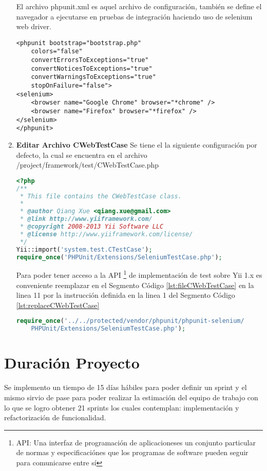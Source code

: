 \begin{enumerate}
El archivo phpunit.xml es aquel archivo de configuraci\'{o}n, tambi\'{e}n se 
define el navegador a ejecutarse en pruebas de integraci\'{o}n haciendo uso
de selenium web driver.

\begin{lstlisting}[]
<phpunit bootstrap="bootstrap.php"
	colors="false"
    convertErrorsToExceptions="true"
    convertNoticesToExceptions="true"
    convertWarningsToExceptions="true"
  	stopOnFailure="false">
<selenium>
	<browser name="Google Chrome" browser="*chrome" />
    <browser name="Firefox" browser="*firefox" />
</selenium>
</phpunit>
\end{lstlisting}

\item \textbf{Editar Archivo CWebTestCase}
Se tiene el la siguiente configuraci\'{o}n por defecto, la cual se encuentra en
el archivo /project/framework/test/CWebTestCase.php

\begin{lstlisting}[language=PHP, caption={Cabecera Archivo CWebTestCase}, label={lst:fileCWebTestCase}]
<?php
/**
 * This file contains the CWebTestCase class.
 *
 * @author Qiang Xue <qiang.xue@gmail.com>
 * @link http://www.yiiframework.com/
 * @copyright 2008-2013 Yii Software LLC
 * @license http://www.yiiframework.com/license/
 */
Yii::import('system.test.CTestCase');
require_once('PHPUnit/Extensions/SeleniumTestCase.php');
\end{lstlisting}

Para poder tener acceso a la API \footnote{API: Una interfaz de programaci\'{o}n
de aplicacioneses un conjunto particular de normas y especificaci\'{o}nes que
los programas de software pueden seguir para comunicarse entre s\'{i}} de 
implementaci\'{o}n de test sobre Yii 1.x es conveniente reemplazar en el Segmento C\'{o}digo
\ref{lst:fileCWebTestCase} en la linea 11 por la instrucci\'{o}n definida en la linea
1 del Segmento C\'{o}digo \ref{lst:replaceCWebTestCase}

\begin{lstlisting}[language=PHP, caption={Instrucci\'{o}n a Reemplazar}, label={lst:replaceCWebTestCase}]
require_once('../../protected/vendor/phpunit/phpunit-selenium/
	PHPUnit/Extensions/SeleniumTestCase.php');
\end{lstlisting}

\end{enumerate}

\section{Duraci\'{o}n Proyecto}

Se implemento un tiempo de 15 d\'{i}as h\'{a}biles para poder definir un sprint y
el mismo sirvio de pase para poder realizar la estimaci\'{o}n del equipo de 
trabajo con lo que se logro obtener 21 sprints los cuales contemplan: 
implementaci\'{o}n y refactorizaci\'{o}n de funcionalidad.